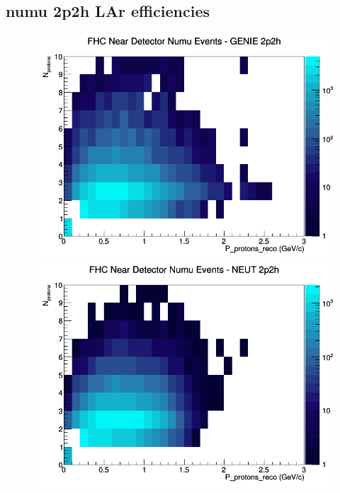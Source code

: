 \documentclass[12pt]{article}
\begin{document}
\subsection{numu 2p2h LAr efficiencies}
\begin{figure}[h]
\includegraphics[width=\linewidth]{eff_N_P/LAr/protons/2p2h_FHC_ND_numu_N_P_GENIE.png}
\endminipage
{}
\includegraphics[width=\linewidth]{eff_N_P/LAr/protons/2p2h_FHC_ND_numu_N_P_NEUT.png}
\endminipage
{}

\end{figure}
\end{document}
